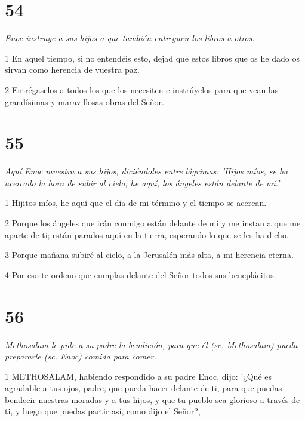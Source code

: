 \chapter{54}

\par \textit{Enoc instruye a sus hijos a que también entreguen los libros a otros.}

\par 1 En aquel tiempo, si no entendéis esto, dejad que estos libros que os he dado os sirvan como herencia de vuestra paz.

\par 2 Entrégaselos a todos los que los necesiten e instrúyelos para que vean las grandísimas y maravillosas obras del Señor.



\chapter{55}

\par \textit{Aquí Enoc muestra a sus hijos, diciéndoles entre lágrimas: 'Hijos míos, se ha acercado la hora de subir al cielo; he aquí, los ángeles están delante de mí.'}

\par 1 Hijitos míos, he aquí que el día de mi término y el tiempo se acercan.

\par 2 Porque los ángeles que irán conmigo están delante de mí y me instan a que me aparte de ti; están parados aquí en la tierra, esperando lo que se les ha dicho.

\par 3 Porque mañana subiré al cielo, a la Jerusalén más alta, a mi herencia eterna.

\par 4 Por eso te ordeno que cumplas delante del Señor todos sus beneplácitos.

\chapter{56}

\par \textit{Methosalam le pide a su padre la bendición, para que él (sc. Methosalam) pueda prepararle (sc. Enoc) comida para comer.}

\par 1 METHOSALAM, habiendo respondido a su padre Enoc, dijo: '¿Qué es agradable a tus ojos, padre, que pueda hacer delante de ti, para que puedas bendecir nuestras moradas y a tus hijos, y que tu pueblo sea glorioso a través de ti, y luego que puedas partir así, como dijo el Señor?,

